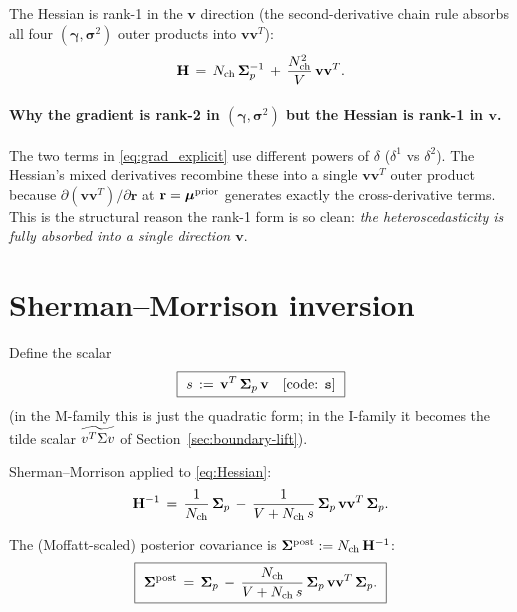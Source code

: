 \documentclass[11pt]{article}
\begin{document}
The Hessian is rank-1 in the $\mathbf{v}$ direction (the second-derivative
chain rule absorbs all four $(\boldsymbol{\gamma},\boldsymbol{\sigma}^2)$
outer products into $\mathbf{v}\mathbf{v}^{T}$):
\begin{equation}
  \mathbf{H}
  \,=\,
  N_{\mathrm{ch}}\,\boldsymbol{\Sigma}_p^{-1}
  \,+\,
  \frac{N_{\mathrm{ch}}^2}{V}\,\mathbf{v}\mathbf{v}^{T}.
  \label{eq:Hessian}
\end{equation}

\paragraph{Why the gradient is rank-2 in $(\boldsymbol{\gamma},\boldsymbol{\sigma}^2)$
but the Hessian is rank-1 in $\mathbf{v}$.}
The two terms in \eqref{eq:grad_explicit} use different powers of $\delta$
($\delta^1$ vs $\delta^2$). The Hessian's mixed derivatives recombine these
into a single $\mathbf{v}\mathbf{v}^{T}$ outer product because
$\partial(\mathbf{v}\mathbf{v}^{T})/\partial\mathbf{r}$ at $\mathbf{r}=\boldsymbol{\mu}^{\mathrm{prior}}$
generates exactly the cross-derivative terms. This is the structural reason
the rank-1 form is so clean: \emph{the heteroscedasticity is fully absorbed
into a single direction $\mathbf{v}$}.

\section{Sherman--Morrison inversion}

Define the scalar
\begin{equation}
  \boxed{\
  s \,:=\, \mathbf{v}^{T}\,\boldsymbol{\Sigma}_p\,\mathbf{v}
  \quad\text{[code: \texttt{s}]}
  \ }
\end{equation}
(in the M-family this is just the quadratic form; in the I-family it
becomes the tilde scalar $\widetilde{v^{T}\Sigma v}$ of Section~\ref{sec:boundary-lift}).

Sherman--Morrison applied to \eqref{eq:Hessian}:
\begin{equation}
  \mathbf{H}^{-1}
  \,=\,
  \frac{1}{N_{\mathrm{ch}}}\,\boldsymbol{\Sigma}_p
  \,-\,
  \frac{1}{V + N_{\mathrm{ch}}\,s}\,\boldsymbol{\Sigma}_p\,\mathbf{v}\mathbf{v}^{T}\,\boldsymbol{\Sigma}_p.
\end{equation}

The (Moffatt-scaled) posterior covariance is $\boldsymbol{\Sigma}^{\mathrm{post}} := N_{\mathrm{ch}}\,\mathbf{H}^{-1}$:
\begin{equation}
  \boxed{\
  \boldsymbol{\Sigma}^{\mathrm{post}}
  \,=\,
  \boldsymbol{\Sigma}_p
  \,-\,
  \frac{N_{\mathrm{ch}}}{V + N_{\mathrm{ch}}\,s}\,\boldsymbol{\Sigma}_p\,\mathbf{v}\mathbf{v}^{T}\,\boldsymbol{\Sigma}_p.
  \ }
  \label{eq:Sigma_post_MRT}
\end{equation}
\end{document}
